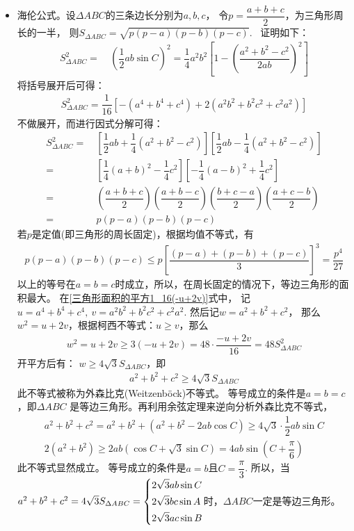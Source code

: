 \begin{itemize}[leftmargin=\inteval{\myitemleftmargin}pt,itemsep=
   \inteval{\myitemitempsep}pt,topsep=\inteval{\myitemtopsep}pt]
\item 海伦公式。设$ \Delta ABC $的三条边长分别为$ a,b,c $，
令$ p=\dfrac{a+b+c}{2} $，为三角形周长的一半，
则$ S_{\Delta ABC}=\sqrt{p(p-a)(p-b)(p-c)} $. \ 证明如下：
\begin{align*}
    S_{\Delta ABC}^2=&\ \left(\dfrac{1}{2}ab\sin C \right) ^2=
    \dfrac{1}{4}a^2b^2\left[ 1-\left( {\dfrac{a^2+b^2-c^2}{2ab}}\right)^2 \right] 
\end{align*}
将括号展开后可得：
\begin{align}\label{三角形面积的平方1_16(-u+2v)}
    S_{\Delta ABC}^2=\dfrac{1}{16}\left[-(a^4+b^4+c^4)+2(a^2b^2+b^2c^2+c^2a^2)\right]
\end{align}
不做展开，而进行因式分解可得：
\begin{align*}
    S_{\Delta ABC}^2
    =&\ \left[ \dfrac{1}{2}ab+\dfrac{1}{4}
    (a^2+b^2-c^2)\right] \left[ \dfrac{1}{2}ab-\dfrac{1}{4} (a^2+b^2-c^2) \right] \\
    =&\ \left[  \dfrac{1}{4}(a+b)^2-\dfrac{1}{4}c^2 \right] 
    \left[ -\dfrac{1}{4}(a-b)^2+\dfrac{1}{4}c^2 \right] \\
    =&\ \left(\dfrac{a+b+c}{2}\right) \left(\dfrac{a+b-c}{2}\right) 
    \left(\dfrac{b+c-a}{2}\right) \left(\dfrac{a+c-b}{2}\right) \\
    =&\ p(p-a)(p-b)(p-c)
\end{align*}
若$ p $是定值(即三角形的周长固定)，根据均值不等式，有
\begin{gather}\label{正三角形面积最大}
    p(p-a)(p-b)(p-c)\leq p\left[\dfrac{(p-a)+(p-b)+(p-c)}{3}\right]^3=\dfrac{p^4}{27}
\end{gather}
以上的等号在$ a=b=c $时成立，所以，在周长固定的情况下，等边三角形的面积最大。
在\eqref{三角形面积的平方1_16(-u+2v)}式中，
记$ u=a^4+b^4+c^4,\ v=a^2b^2+b^2c^2+c^2a^2 $. 然后记$ w=a^2+b^2+c^2 $，
那么$ w^2=u+2v $，根据柯西不等式：$ u\geq v $，那么
\begin{gather*}
    w^2=u+2v \geq 3(-u+2v)=48\cdot\dfrac{-u+2v}{16}=48 S_{\Delta ABC}^2
\end{gather*}
开平方后有：
$ w\geq 4\sqrt{3}S_{\Delta ABC} $，即
\begin{gather}\label{外森比克不等式}
    a^2+b^2+c^2 \geq 4\sqrt{3}S_{\Delta ABC}
\end{gather}
此不等式被称为外森比克(Weitzenböck)不等式。
等号成立的条件是$ a=b=c $，即$ \Delta ABC $
是等边三角形。再利用余弦定理来逆向分析外森比克不等式，
\begin{gather*}
    a^2+b^2+c^2=a^2+b^2+(a^2+b^2-2ab\cos C)\geq 4\sqrt{3}\cdot
    \dfrac{1}{2}ab\sin C \\
    2(a^2+b^2)\geq 2ab(\cos C+\sqrt{3}\sin C)=4ab\sin(C+\dfrac{\pi}{6})
\end{gather*}
此不等式显然成立。 等号成立的条件是$a=b$且$C=\dfrac{\pi}{3}$.
所以，当$ a^2+b^2+c^2=4\sqrt{3}S_{\Delta ABC}=
\begin{dcases}
    2\sqrt{3}ab\sin C \\
    2\sqrt{3}bc\sin A \\
    2\sqrt{3}ac\sin B
\end{dcases}$时，$ \Delta ABC $一定是等边三角形。


\end{itemize}
